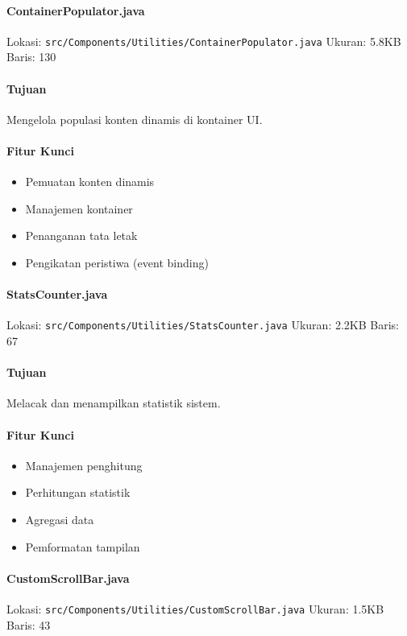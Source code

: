 \documentclass[12pt,a4paper]{article}
\begin{document}
\paragraph{ContainerPopulator.java}
Lokasi: \texttt{src/Components/Utilities/ContainerPopulator.java}
Ukuran: 5.8KB
Baris: 130

\paragraph{Tujuan}
Mengelola populasi konten dinamis di kontainer UI.

\paragraph{Fitur Kunci}
\begin{itemize}
    \item Pemuatan konten dinamis
    \item Manajemen kontainer
    \item Penanganan tata letak
    \item Pengikatan peristiwa (event binding)
\end{itemize}

\paragraph{StatsCounter.java}
Lokasi: \texttt{src/Components/Utilities/StatsCounter.java}
Ukuran: 2.2KB
Baris: 67

\paragraph{Tujuan}
Melacak dan menampilkan statistik sistem.

\paragraph{Fitur Kunci}
\begin{itemize}
    \item Manajemen penghitung
    \item Perhitungan statistik
    \item Agregasi data
    \item Pemformatan tampilan
\end{itemize}

\paragraph{CustomScrollBar.java}
Lokasi: \texttt{src/Components/Utilities/CustomScrollBar.java}
Ukuran: 1.5KB
Baris: 43
\end{document}

